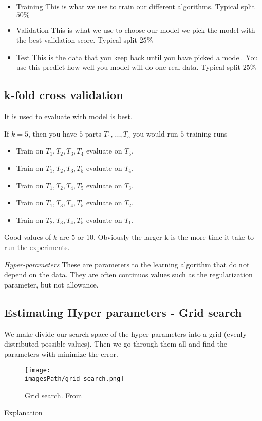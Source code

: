 \begin{itemize}
    \item Training \newline
    This is what we use to train our different algorithms. Typical split $50\%$
    \item Validation \newline 
    This is what we use to choose our model we pick the model with the best validation score. Typical split $25\%$
    \item Test \newline 
    This is the data that you keep back until you have picked a model. You use this predict how well you model will do one real data. Typical split $25\%$
\end{itemize}

\subsection{k-fold cross validation}
It is used to evaluate with model is best.

If $k = 5$, then you have $5$ parts $T_1,\ldots,T_5$ you would run $5$ training runs
\begin{itemize}
    \item Train on $T_1, T_2, T_3, T_4$ evaluate on $T_5$.
    \item Train on $T_1, T_2, T_3, T_5$ evaluate on $T_4$.
    \item Train on $T_1, T_2, T_4, T_5$ evaluate on $T_3$.
    \item Train on $T_1, T_3, T_4, T_5$ evaluate on $T_2$.
    \item Train on $T_2, T_3, T_4, T_5$ evaluate on $T_1$.
\end{itemize}
Good values of $k$ are $5$ or $10$. Obviously the larger k is the more time it take to run the experiments.

\textit{Hyper-parameters} \newline
These are parameters to the learning algorithm that do not depend on the data.
They are often continuos values such as the regularization parameter, but not allowance.

\subsection{Estimating Hyper parameters - Grid search}
We make divide our search space of the hyper parameters into a grid (evenly distributed possible values).
Then we go through them all and find the parameters with minimize the error.
\begin{figure}[!h]
    \centering
    \texttt{[image: \\imagesPath/grid\_search.png]}
    \caption{Grid search. From \cite{}}
\end{figure}
\href{https://www.youtube.com/watch?v=ttE0F7fghfk}{Explanation}


